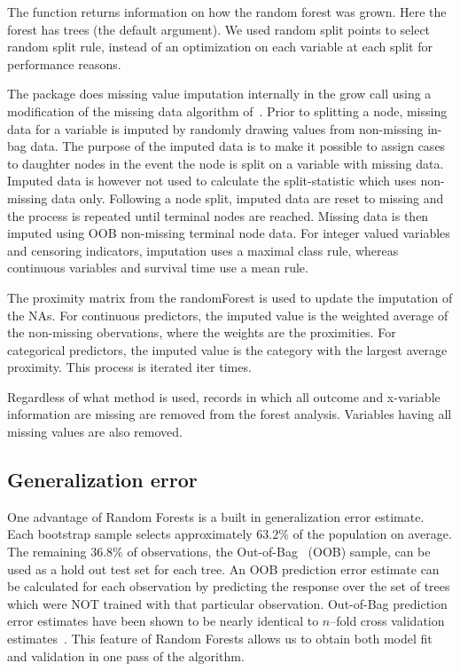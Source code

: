 \documentclass[nojss]{jss}\usepackage[]{graphicx}\usepackage[]{color}
\begin{document}
The  function returns information on how the random forest was grown. Here the  forest has  trees (the default  argument). We used  random split points to select random split rule, instead of an optimization on each variable at each split for performance reasons. 


The  package does missing value imputation internally in the  grow call using a modification of the missing data algorithm of~\cite{Ishwaran:2008}. Prior to splitting a node, missing data for a variable is imputed by randomly drawing values from non-missing in-bag data. The purpose of the imputed data is to make it possible to assign cases to daughter nodes in the event the node is split on a variable with missing data. Imputed data is however not used to calculate the split-statistic which uses non-missing data only. Following a node split, imputed data are reset to missing and the process is repeated until terminal nodes are reached. Missing data is then imputed using OOB non-missing terminal node data. For integer valued variables and censoring indicators, imputation uses a maximal class rule, whereas continuous variables and survival time use a mean rule.

The proximity matrix from the randomForest is used to update the imputation of the NAs. For continuous predictors, the imputed value is the weighted average of the non-missing obervations, where the weights are the proximities. For categorical predictors, the imputed value is the category with the largest average proximity. This process is iterated iter times.

Regardless of what method is used, records in which all outcome and x-variable information are missing are removed from the forest analysis. Variables having all missing values are also removed.


\subsection{Generalization error}

One advantage of Random Forests is a built in generalization error estimate. Each bootstrap sample selects approximately $63.2\%$ of the population on average. The remaining $36.8\%$ of observations, the Out-of-Bag~\citep{BreimanOOB:1996e} (OOB) sample, can be used as a hold out test set for each tree. An OOB prediction error estimate can be calculated for each observation by predicting the response over the set of trees which were NOT trained with that particular observation. Out-of-Bag prediction error estimates have been shown to be nearly identical to $n$--fold cross validation estimates~\citep{StatisticalLearning:2009}. This feature of Random Forests allows us to obtain both model fit and validation in one pass of the algorithm.
\end{document}
